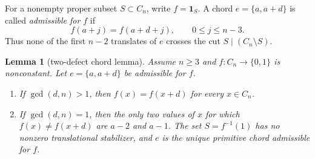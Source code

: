\documentclass[11pt,a4paper]{amsart}
\newtheorem{lemma}[theorem]{Lemma}
\theoremstyle{definition}
\theoremstyle{remark}
\newcommand{\Cn}{C_n}
\begin{document}
For a nonempty proper subset $S\subset\Cn$, write
$f=\mathbf 1_S$.  A chord $e=\{a,a+d\}$ is called \emph{admissible for
$f$} if
\begin{equation}\label{eq:admissible}
       f(a+j)=f(a+d+j),\qquad 0\leq j\leq n-3.
\end{equation}
Thus none of the first $n-2$ translates of $e$ crosses the cut
$S\mid(\Cn\setminus S)$.

\begin{lemma}[two-defect chord lemma]\label{lem:defect}
Assume $n\geq3$ and $f:\Cn\to\{0,1\}$ is nonconstant.  Let
$e=\{a,a+d\}$ be admissible for $f$.
\begin{enumerate}
\item If $\gcd(d,n)>1$, then $f(x)=f(x+d)$ for every $x\in\Cn$.
\item If $\gcd(d,n)=1$, then the only two values of $x$ for which
  $f(x)\ne f(x+d)$ are $a-2$ and $a-1$.  The set $S=f^{-1}(1)$ has no
  nonzero translational stabilizer, and $e$ is the unique primitive chord
  admissible for $f$.
\end{enumerate}
\end{lemma}
\end{document}
